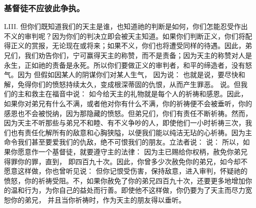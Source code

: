 
\subsubsection{基督徒不应彼此争执。}

LIII. 但你们既知道我们的天主是谁，也知道祂的判断是如何，你们怎能忍受作出不义的审判呢？因为你们的判决立即会被天主知道。如果你们判断正义，你们将配得正义的赏报，无论现在或将来；如果不义，你们也将遭受同样的待遇。因此，弟兄们，我们劝告你们，宁可赢得天主的称赞，而不是责备；因为天主的称赞对人是永生，正如祂的责备是永死。所以你们要做正义的审判者，和平的缔造者，没有怒气。因为  但假如因某人的阴谋你们对某人生气，  因为说： 也就是说，要尽快和解，免得你们的愤怒持续太久，变成根深蒂固的仇恨，从而产生罪恶。 说。但我们的主和救主在福音中说：  如今给天主的礼物就是每个人的祈祷和感恩。因此，如果你对弟兄有什么不满，或者他对你有什么不满，你的祈祷便不会被垂听，你的感恩也不会被悦纳，因为那隐藏的愤怒。但弟兄们，你们有责任不断祈祷。然而，因为天主不听那些与弟兄不和睦、有不义争吵的人，即使他们一小时祈祷三次，我们也有责任化解所有的敌意和心胸狭隘，以便我们能以纯洁无玷的心祈祷。因为主命令我们甚至要爱我们的仇敌，绝不可恨我们的朋友。立法者说：    说： 所以，如果你愿意作一个基督徒，就要遵守主的法律：  因为主已赐给你权柄，赦免你弟兄得罪你的罪，直到， 即四百九十次。因此，你曾多少次赦免你的弟兄，如今却不愿意这样做，你也曾听见说：  但你记恨受伤害，保持敌意，进入审判，怀疑祂的愤怒，你的祈祷受阻。不，如果你赦免了你的弟兄四百九十次，还要更多地增加你的温和行为，为你自己的益处而行善。即使他不这样做，你仍要为了天主而尽力宽恕你的弟兄，  并且当你祈祷时，作为天主的朋友得以垂听。\par

